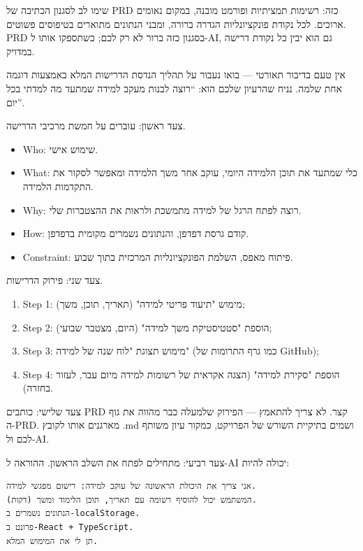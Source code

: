 שימו לב לסגנון הכתיבה של PRD כזה: רשימות תמציתיות ופורמט מובנה, במקום נאומים ארוכים. לכל נקודת פונקציונליות הגדרה ברורה, ומבני הנתונים מתוארים בטיפוסים פשוטים. PRD בסגנון כזה ברור לא רק לכם; כשתספקו אותו ל-AI, גם הוא יבין כל נקודת דרישה במדויק.


אין טעם בדיבור תאורטי — בואו נעבור על תהליך הנדסת הדרישות המלא באמצעות דוגמה אחת שלמה. נניח שהרעיון שלכם הוא: “רוצה לבנות מעקב למידה שמתעד מה למדתי בכל יום”.

צעד ראשון: עוברים על חמשת מרכיבי הדרישה.

\begin{itemize}
  \item Who: שימוש אישי.
  \item What: כלי שמתעד את תוכן הלמידה היומי, עוקב אחר משך הלמידה ומאפשר לסקור את התקדמות הלמידה.
  \item Why: רוצה לפתח הרגל של למידה מתמשכת ולראות את ההצטברות שלי.
  \item How: קודם גרסת דפדפן, והנתונים נשמרים מקומית בדפדפן.
  \item Constraint: פיתוח מאפס, השלמת הפונקציונליות המרכזית בתוך שבוע.
\end{itemize}

צעד שני: פירוק הדרישות.

\begin{enumerate}
  \item Step 1: מימוש "תיעוד פריטי למידה" (תאריך, תוכן, משך);
  \item Step 2: הוספת "סטטיסטיקת משך למידה" (היום, מצטבר שבועי);
  \item Step 3: מימוש תצוגת "לוח שנה של למידה" (כמו גרף התרומות של GitHub);
  \item Step 4: הוספת "סקירת למידה" (הצגה אקראית של רשומות למידה מיום עבר, לעזור בחזרה).
\end{enumerate}

צעד שלישי: כותבים PRD קצר. לא צריך להתאמץ — הפירוק שלמעלה כבר מהווה את גוף ה-PRD. מארגנים אותו לקובץ .md ושמים בתיקיית השורש של הפרויקט, כמקור עיון משותף לכם ול-AI.

צעד רביעי: מתחילים לפתח את השלב הראשון. ההוראה ל-AI יכולה להיות:

\begin{lstlisting}
אני צריך את היכולת הראשונה של עוקב למידה: רישום מפגשי למידה.
המשתמש יכול להוסיף רשומה עם תאריך, תוכן הלימוד ומשך (דקות).
הנתונים נשמרים ב-localStorage.
פרונט ב-React + TypeScript.
תן לי את המימוש המלא.
\end{lstlisting}

